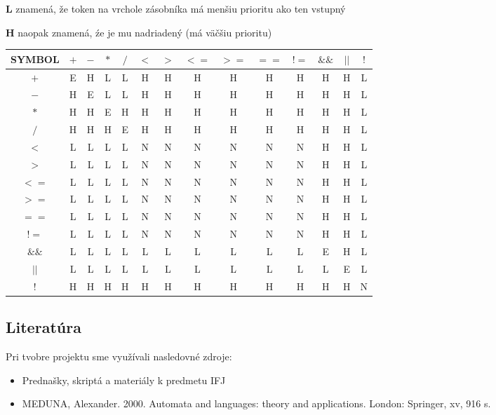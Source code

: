 \documentclass[12pt, a4paper]{article}
\begin{document}
        \textbf{L} znamená, že token na vrchole zásobníka má menšiu prioritu ako ten vstupný

        \textbf{H} naopak znamená, źe je mu nadriadený (má väčšiu prioritu)

        \begin{center}
            \begin{tabular}{| c | c | c | c | c | c | c | c | c | c | c | c | c | c |}
            \hline
            SYMBOL & $+$ & $-$ & $*$ & $/$ & $<$ & $>$ & $<=$ & $>=$ & $==$ & $!=$ & $\&\&$ & $||$ & $!$\\
            \hline
            $+$ & E & H & L & L & H & H & H & H & H & H & H & H & L\\
            $-$ & H & E & L & L & H & H & H & H & H & H & H & H & L\\
            $*$ & H & H & E & H & H & H & H & H & H & H & H & H & L\\
            $/$ & H & H & H & E & H & H & H & H & H & H & H & H & L\\
            $<$ & L & L & L & L & N & N & N & N & N & N & H & H & L\\
            $>$ & L & L & L & L & N & N & N & N & N & N & H & H & L\\
            $<=$ & L & L & L & L & N & N & N & N & N & N & H & H & L\\
            $>=$ & L & L & L & L & N & N & N & N & N & N & H & H & L\\
            $==$ & L & L & L & L & N & N & N & N & N & N & H & H & L\\
            $!=$ & L & L & L & L & N & N & N & N & N & N & H & H & L\\
            $\&\&$ & L & L & L & L & L & L & L & L & L & L & E & H & L\\
            $||$ & L & L & L & L & L & L & L & L & L & L & L & E & L\\
            $!$ & H & H & H & H & H & H & H & H & H & H & H & H & N\\
            \hline
            \end{tabular}
        \end{center}
        \subsection{Literatúra}
	        Pri tvobre projektu sme využívali nasledovné zdroje:
	        \begin{itemize}
	            \item Prednašky, skriptá a materiály k predmetu IFJ
	            \item MEDUNA, Alexander. 2000. Automata and languages: theory and applications. London: Springer, xv, 916 s.
	        \end{itemize}
\end{document}
